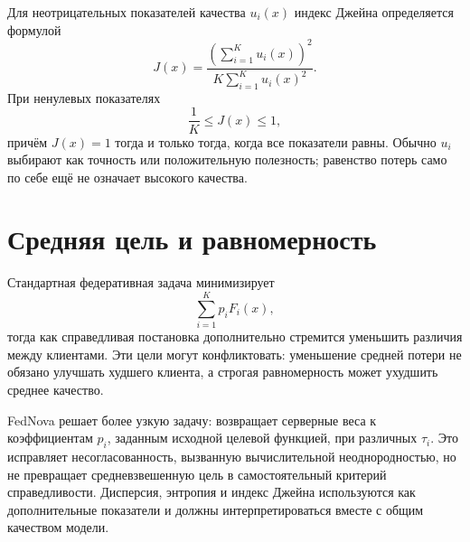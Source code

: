 Для неотрицательных показателей качества \(u_i(x)\) индекс Джейна
определяется формулой
\[
    J(x)
    =
    \frac{
        \left(\displaystyle\sum_{i=1}^{K}u_i(x)\right)^2
    }{
        K\displaystyle\sum_{i=1}^{K}u_i(x)^2
    }.
\]
При ненулевых показателях
\[
    \frac1K\le J(x)\le1,
\]
причём \(J(x)=1\) тогда и только тогда, когда все показатели равны.
Обычно \(u_i\) выбирают как точность или положительную полезность;
равенство потерь само по себе ещё не означает высокого качества.

\section{Средняя цель и равномерность}

Стандартная федеративная задача минимизирует
\[
    \sum_{i=1}^{K}p_iF_i(x),
\]
тогда как справедливая постановка дополнительно стремится уменьшить
различия между клиентами. Эти цели могут конфликтовать: уменьшение
средней потери не обязано улучшать худшего клиента, а строгая
равномерность может ухудшить среднее качество.

FedNova решает более узкую задачу: возвращает серверные веса к
коэффициентам \(p_i\), заданным исходной целевой функцией, при
различных \(\tau_i\). Это исправляет несогласованность, вызванную
вычислительной неоднородностью, но не превращает средневзвешенную цель
в самостоятельный критерий справедливости. Дисперсия, энтропия и
индекс Джейна используются как дополнительные показатели и должны
интерпретироваться вместе с общим качеством модели.
